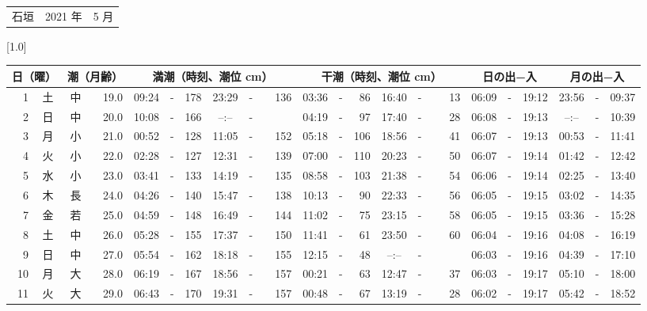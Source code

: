 \documentclass[12pt,a4j]{jsarticle}
\begin{document}
 \begin{table}[htbp]
 \begin{center}
 \begin{tabular}{lcc}
 \LARGE{石垣}  & \large{2021 年} & \large{ 5 月} \\
 \end{tabular}
 \end{center}
 \begin{center}
    \scalebox{0.7}[1.0]{
    \begin{tabular}{|rc|cr|ccrccr|ccrccr|ccc|ccc|}
    \hline
    \multicolumn{2}{|c|}{日（曜）} & \multicolumn{2}{c|}{潮（月齢）} & \multicolumn{6}{c|}{満潮（時刻、潮位 cm）} & \multicolumn{6}{c|}{干潮（時刻、潮位 cm）} & \multicolumn{3}{c|}{日の出−入} &  \multicolumn{3}{c|}{月の出−入}\\
 \hline
 1 & 土 & 中 & 19.0 &  09:24 &-& 178 &  23:29 &-& 136 &  03:36 &-&  86 &  16:40 &-&  13 & 06:09 & -& 19:12 & 23:56 & -& 09:37 \\
 2 & 日 & 中 & 20.0 &  10:08 &-& 166 &  --:-- &-&~~~~~ &  04:19 &-&  97 &  17:40 &-&  28 & 06:08 & -& 19:13 & --:-- & -& 10:39 \\
 3 & 月 & 小 & 21.0 &  00:52 &-& 128 &  11:05 &-& 152 &  05:18 &-& 106 &  18:56 &-&  41 & 06:07 & -& 19:13 & 00:53 & -& 11:41 \\
 4 & 火 & 小 & 22.0 &  02:28 &-& 127 &  12:31 &-& 139 &  07:00 &-& 110 &  20:23 &-&  50 & 06:07 & -& 19:14 & 01:42 & -& 12:42 \\
 5 & 水 & 小 & 23.0 &  03:41 &-& 133 &  14:19 &-& 135 &  08:58 &-& 103 &  21:38 &-&  54 & 06:06 & -& 19:14 & 02:25 & -& 13:40 \\
 6 & 木 & 長 & 24.0 &  04:26 &-& 140 &  15:47 &-& 138 &  10:13 &-&  90 &  22:33 &-&  56 & 06:05 & -& 19:15 & 03:02 & -& 14:35 \\
 7 & 金 & 若 & 25.0 &  04:59 &-& 148 &  16:49 &-& 144 &  11:02 &-&  75 &  23:15 &-&  58 & 06:05 & -& 19:15 & 03:36 & -& 15:28 \\
 8 & 土 & 中 & 26.0 &  05:28 &-& 155 &  17:37 &-& 150 &  11:41 &-&  61 &  23:50 &-&  60 & 06:04 & -& 19:16 & 04:08 & -& 16:19 \\
 9 & 日 & 中 & 27.0 &  05:54 &-& 162 &  18:18 &-& 155 &  12:15 &-&  48 &  --:-- &-&~~~~~ & 06:03 & -& 19:16 & 04:39 & -& 17:10 \\
10 & 月 & 大 & 28.0 &  06:19 &-& 167 &  18:56 &-& 157 &  00:21 &-&  63 &  12:47 &-&  37 & 06:03 & -& 19:17 & 05:10 & -& 18:00 \\
11 & 火 & 大 & 29.0 &  06:43 &-& 170 &  19:31 &-& 157 &  00:48 &-&  67 &  13:19 &-&  28 & 06:02 & -& 19:17 & 05:42 & -& 18:52 \\

\end{tabular}}
\end{center}
\end{table}
\end{document}
